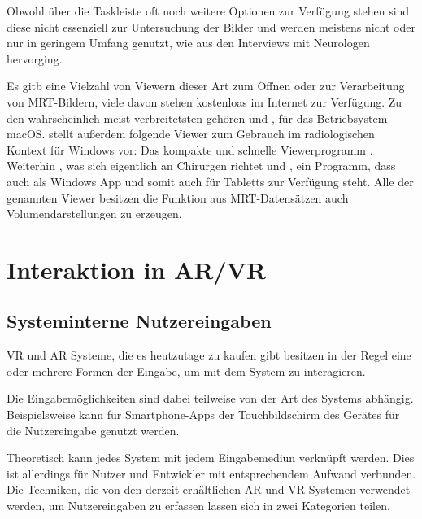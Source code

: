 Obwohl über die Taskleiste oft noch weitere Optionen zur Verfügung stehen sind diese nicht essenziell zur Untersuchung der Bilder und werden meistens nicht oder nur in geringem Umfang genutzt, wie aus den Interviews mit Neurologen hervorging.

Es gitb eine Vielzahl von Viewern dieser Art zum Öffnen oder zur Verarbeitung von MRT-Bildern, viele davon stehen kostenloas im Internet zur Verfügung. 
Zu den wahrscheinlich meist verbreitetsten gehören \cite{osirix} und \cite{horos}, für das Betriebsystem macOS. \cite{radiocafe} stellt außerdem folgende Viewer zum Gebrauch im radiologischen Kontext für Windows vor: Das kompakte und schnelle Viewerprogramm \cite{radiant}. Weiterhin \cite{prosurgical}, was sich eigentlich an Chirurgen richtet und \cite{navegatium}, ein Programm, dass auch als Windows App und somit auch für Tabletts zur Verfügung steht.
Alle der genannten Viewer besitzen die Funktion aus MRT-Datensätzen auch Volumendarstellungen zu erzeugen.

\section{Interaktion in AR/VR}	
\label{VRInteraktion}							 %
\subsection{Systeminterne Nutzereingaben}

VR und AR Systeme, die es heutzutage zu kaufen gibt besitzen in der Regel  eine oder mehrere Formen der Eingabe, um mit dem System zu interagieren.

Die Eingabemöglichkeiten sind dabei teilweise von der Art des Systems abhängig. 
Beispielsweise kann für Smartphone-Apps der Touchbildschirm des Gerätes für die Nutzereingabe genutzt werden. 

Theoretisch kann jedes System mit jedem Eingabemediun verknüpft werden. Dies ist allerdings für Nutzer und Entwickler mit entsprechendem Aufwand verbunden. Die Techniken, die von den derzeit erhältlichen AR und VR Systemen verwendet werden, um Nutzereingaben zu erfassen lassen sich in zwei Kategorien teilen. 
